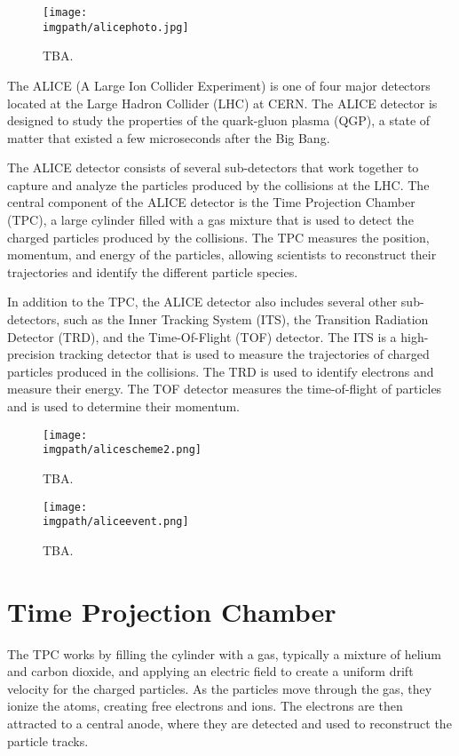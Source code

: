 \def \imgpath {"./figures/alice"}


\begin{figure}%
\centering%
\texttt{[image: \\imgpath/alicephoto.jpg]}
\caption{TBA.}
\label{fig:experiment:cern}
\end{figure}

The ALICE (A Large Ion Collider Experiment) is one of four major detectors located at the Large Hadron Collider (LHC) at CERN. The ALICE detector is designed to study the properties of the quark-gluon plasma (QGP), a state of matter that existed a few microseconds after the Big Bang.

The ALICE detector consists of several sub-detectors that work together to capture and analyze the particles produced by the collisions at the LHC. The central component of the ALICE detector is the Time Projection Chamber (TPC), a large cylinder filled with a gas mixture that is used to detect the charged particles produced by the collisions. The TPC measures the position, momentum, and energy of the particles, allowing scientists to reconstruct their trajectories and identify the different particle species.

In addition to the TPC, the ALICE detector also includes several other sub-detectors, such as the Inner Tracking System (ITS), the Transition Radiation Detector (TRD), and the Time-Of-Flight (TOF) detector. The ITS is a high-precision tracking detector that is used to measure the trajectories of charged particles produced in the collisions. The TRD is used to identify electrons and measure their energy. The TOF detector measures the time-of-flight of particles and is used to determine their momentum.

\begin{figure}%
\centering%
\texttt{[image: \\imgpath/alicescheme2.png]}
\caption{TBA.}
\label{fig:experiment:cern}
\end{figure}


\begin{figure}%
\centering%
\texttt{[image: \\imgpath/aliceevent.png]}
\caption{TBA.}
\label{fig:experiment:cern}
\end{figure}

\section{Time Projection Chamber}

The TPC works by filling the cylinder with a gas, typically a mixture of helium and carbon dioxide, and applying an electric field to create a uniform drift velocity for the charged particles. As the particles move through the gas, they ionize the atoms, creating free electrons and ions. The electrons are then attracted to a central anode, where they are detected and used to reconstruct the particle tracks.

